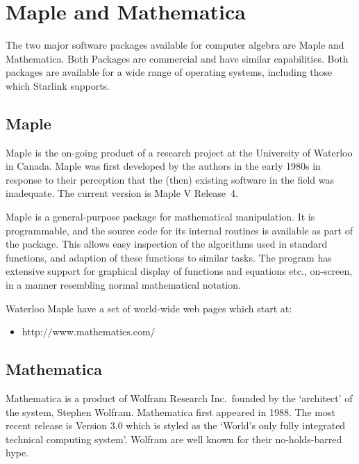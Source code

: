 \section{\label{se_maple_mathematica}Maple and
         Mathematica}

The two major software packages available for computer algebra are Maple
and Mathematica.  Both Packages are commercial and have similar
capabilities.  Both packages are available for a wide range of operating
systems, including those which Starlink supports.


\subsection{Maple}

Maple is the on-going product of a research project at the University of
Waterloo in Canada.  Maple was first developed by the authors in the early
1980s in response to their perception that the (then) existing software in
the field was inadequate.
The current version is Maple V Release~4.

Maple is a general-purpose package for mathematical manipulation.
It is programmable, and the source code for its internal routines is
available as part of the package.
This allows easy inspection of the algorithms used in standard functions,
and adaption of these functions to similar tasks.
The program has extensive support for graphical display of functions and
equations etc., on-screen, in a manner resembling normal mathematical
notation.

Waterloo Maple have a set of world-wide web pages which start at:

\begin{itemize}

\item {}
      {http://www.mathematics.com/}

\end{itemize}


\subsection{Mathematica}

Mathematica is a product of Wolfram Research Inc.\ founded by the
`architect' of the system, Stephen Wolfram.  Mathematica first appeared in
1988.  The most recent release is Version 3.0 which is styled as the
`World's only fully integrated technical computing system'.
Wolfram are well known for their no-holds-barred hype.


